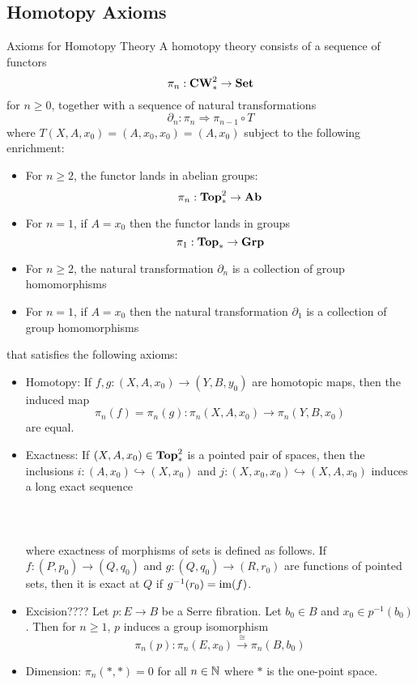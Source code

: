 \documentclass[a4paper]{article}
\begin{document}
\subsection{Homotopy Axioms}
\begin{defn}{Axioms for Homotopy Theory}{} A homotopy theory consists of a sequence of functors $$\pi_n:\bold{CW}_\ast^2\to\bold{Set}$$ for $n\geq 0$, together with a sequence of natural transformations $$\partial_n:\pi_n\Rightarrow\pi_{n-1}\circ T$$ where $T(X,A,x_0)=(A,x_0,x_0)=(A,x_0)$ subject to the following enrichment: 
\begin{itemize}
\item For $n\geq 2$, the functor lands in abelian groups: $$\pi_n:\bold{Top}_\ast^2\to\bold{Ab}$$
\item For $n=1$, if $A=x_0$ then the functor lands in groups $$\pi_1:\bold{Top}_\ast\to\bold{Grp}$$
\item For $n\geq 2$, the natural transformation $\partial_n$ is a collection of group homomorphisms
\item For $n=1$, if $A=x_0$ then the natural transformation $\partial_1$ is a collection of group homomorphisms
\end{itemize}
that satisfies the following axioms: 
\begin{itemize}
\item Homotopy: If $f,g:(X,A,x_0)\to(Y,B,y_0)$ are homotopic maps, then the induced map $$\pi_n(f)=\pi_n(g):\pi_n(X,A,x_0)\to\pi_n(Y,B,x_0)$$ are equal. 
\item Exactness: If $(X,A,x_0)\in\bold{Top}_\ast^2$ is a pointed pair of spaces, then the inclusions $i:(A,x_0)\hookrightarrow(X,x_0)$ and $j:(X,x_0,x_0)\hookrightarrow(X,A,x_0)$ induces a long exact sequence \\~\\
\\~\\
where exactness of morphisms of sets is defined as follows. If $f:(P,p_0)\to(Q,q_0)$ and $g:(Q,q_0)\to(R,r_0)$ are functions of pointed sets, then it is exact at $Q$ if $g^{-1}(r_0)=\operatorname{im}(f)$. 
\item Excision???? Let $p:E\to B$ be a Serre fibration. Let $b_0\in B$ and $x_0\in p^{-1}(b_0)$. Then for $n\geq 1$, $p$ induces a group isomorphism $$\pi_n(p):\pi_n(E,x_0)\overset{\cong}{\longrightarrow}\pi_n(B,b_0)$$
\item Dimension: $\pi_n(\ast,\ast)=0$ for all $n\in\mathbb{N}$ where $\ast$ is the one-point space. 
\end{itemize}
\end{defn}
\end{document}
